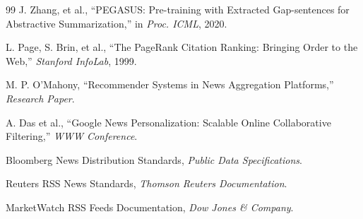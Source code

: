 \documentclass[conference]{IEEEtran}
\begin{document}
\begin{thebibliography}{99}
J. Zhang, et al., ``PEGASUS: Pre-training with Extracted Gap-sentences for Abstractive Summarization,'' in \textit{Proc. ICML}, 2020.

L. Page, S. Brin, et al., ``The PageRank Citation Ranking: Bringing Order to the Web,'' \textit{Stanford InfoLab}, 1999.

M. P. O'Mahony, ``Recommender Systems in News Aggregation Platforms,'' \textit{Research Paper}.

A. Das et al., ``Google News Personalization: Scalable Online Collaborative Filtering,'' \textit{WWW Conference}.

Bloomberg News Distribution Standards, \textit{Public Data Specifications}.

Reuters RSS News Standards, \textit{Thomson Reuters Documentation}.

MarketWatch RSS Feeds Documentation, \textit{Dow Jones \& Company}.

\end{thebibliography}
\end{document}
